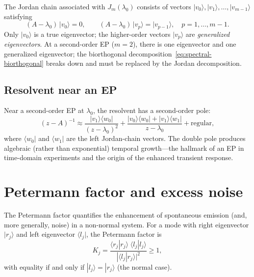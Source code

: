The Jordan chain associated with $J_m(\lambda_0)$ consists of vectors
$|v_0\rangle, |v_1\rangle, \ldots, |v_{m-1}\rangle$ satisfying
\begin{equation}
 (A - \lambda_0)\,|v_0\rangle = 0, \qquad
 (A - \lambda_0)\,|v_p\rangle = |v_{p-1}\rangle,
 \quad p = 1, \ldots, m-1.
 \label{eq:jordan-chain-app}
\end{equation}
Only $|v_0\rangle$ is a true eigenvector; the higher-order vectors
$|v_p\rangle$ are \emph{generalized eigenvectors}. At a second-order
EP ($m = 2$), there is one eigenvector and one generalized eigenvector;
the biorthogonal decomposition~\eqref{eq:spectral-biorthogonal} breaks
down and must be replaced by the Jordan decomposition.

\subsection{Resolvent near an EP}
\label{ssec:resolvent-ep}

Near a second-order EP at $\lambda_0$, the resolvent has a
second-order pole:
\begin{equation}
 (z - A)^{-1} \approx
 \frac{|v_1\rangle\langle w_0|}{(z - \lambda_0)^2}
 + \frac{|v_0\rangle\langle w_0| + |v_1\rangle\langle w_1|}
 {z - \lambda_0}
 + \text{regular},
 \label{eq:resolvent-ep}
\end{equation}
where $\langle w_0|$ and $\langle w_1|$ are the left Jordan-chain
vectors. The double pole produces algebraic (rather than exponential)
temporal growth---the hallmark of an EP in time-domain experiments and
the origin of the enhanced transient response.


\section{Petermann factor and excess noise}
\label{sec:petermann-app}

The Petermann factor quantifies the enhancement of spontaneous emission
(and, more generally, noise) in a non-normal system. For a mode with
right eigenvector $|r_j\rangle$ and left eigenvector $\langle l_j|$,
the Petermann factor is
\begin{equation}
 K_j = \frac{\langle r_j | r_j \rangle \;\langle l_j | l_j \rangle}
 {|\langle l_j | r_j \rangle|^2} \ge 1,
 \label{eq:petermann-def}
\end{equation}
with equality if and only if $|l_j\rangle = |r_j\rangle$ (the normal
case).

